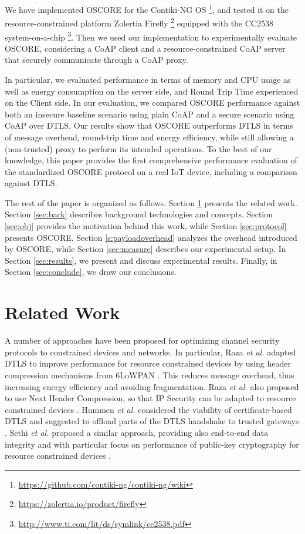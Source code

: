 {We have implemented OSCORE for the Contiki-NG OS \footnote{\url{https://github.com/contiki-ng/contiki-ng/wiki}}, and tested it on the resource-constrained platform Zolertia Firefly \footnote{\url{https://zolertia.io/product/firefly}} equipped with the CC2538 system-on-a-chip \footnote{\url{http://www.ti.com/lit/ds/symlink/cc2538.pdf}}. Then we used our implementation to experimentally evaluate OSCORE, considering a CoAP client and a resource-constrained CoAP server that securely communicate through a CoAP proxy.

In particular, we evaluated performance in terms of memory and CPU usage as well as energy consumption on the server side, and Round Trip Time experienced on the Client side. In our evaluation, we compared OSCORE performance against both an insecure baseline scenario using plain CoAP and a secure scenario using CoAP over DTLS. Our results show that OSCORE outperforms DTLS in terms of message overhead, round-trip time and energy efficiency, while still allowing a (non-trusted) proxy to perform its intended operations. To the best of our knowledge, this paper provides the first comprehensive performance evaluation of the standardized OSCORE protocol on a real IoT device, including a comparison against DTLS.

The rest of the paper is organized as follows. Section \ref{sec:related} presents the related work. Section \ref{sec:back} describes background technologies and concepts. Section \ref{sec:obj} provides the motivation behind this work, while Section \ref{sec:protocol} presents OSCORE. Section \ref{s:payloadoverhead} analyzes the overhead introduced by OSCORE, while Section \ref{sec:measure} describes our experimental setup. In Section \ref{sec:results}, we present and discuss experimental results. Finally, in Section \ref{sec:conclude}, we draw our conclusions.

\section{Related Work}
\label{sec:related}

A number of approaches have been proposed for optimizing channel security protocols to constrained devices and networks. In particular, Raza \textit{et al.} adapted DTLS to improve performance for resource constrained devices by using header compression mechanisms from 6LoWPAN  \cite{cite:lithe}. This reduces message overhead, thus increasing energy efficiency and avoiding fragmentation. Raza \textit{et al.} also proposed to use Next Header Compression, so that IP Security can be adapted to resource constrained devices \cite{cite:razaipsec}. Hummen \textit{et al.} considered the viability of certificate-based DTLS and suggested to offload parts of the DTLS handshake to trusted gateways \cite{cite:hummen}. Sethi \textit{et al.} proposed a similar approach, providing also end-to-end data integrity and with particular focus on performance of public-key cryptography for resource constrained devices \cite{cite:sethi}.

}
